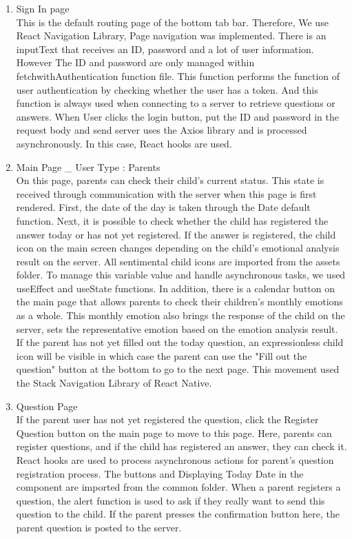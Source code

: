 \documentclass[conference]{IEEEtran}
\begin{document}
\begin{enumerate}
\begin{enumerate}
\begin{enumerate}
               \newline
               \item Sign In page
               \\This is the default routing page of the bottom tab bar. Therefore, We use React Navigation Library, Page navigation was implemented. There is an inputText that receives an ID, password and a lot of user information. However The ID and password are only managed within fetchwithAuthentication function file. This function performs the function of user authentication by checking whether the user has a token. And this function is always used when connecting to a server to retrieve questions or answers. When User clicks the login button, put the ID and password in the request body and send server uses the Axios library and is processed asynchronously. In this case, React hooks are used.
               \newline
               \item Main Page \_ User Type : Parents
               \\On this page, parents can check their child's current status. This state is received through communication with the server when this page is first rendered. First, the date of the day is taken through the Date default function. Next, it is possible to check whether the child has registered the answer today or has not yet registered. If the answer is registered, the child icon on the main screen changes depending on the child's emotional analysis result on the server. All sentimental child icons are imported from the assets folder. To manage this variable value and handle asynchronous tasks, we used useEffect and useState functions. In addition, there is a calendar button on the main page that allows parents to check their children's monthly emotions as a whole. This monthly emotion also brings the response of the child on the server, sets the representative emotion based on the emotion analysis result. If the parent has not yet filled out the today question, an expressionless child icon will be visible in which case the parent can use the "Fill out the question" button at the bottom to go to the next page. This movement used the Stack Navigation Library of React Native.
               \newline
               \item Question Page
               \\If the parent user has not yet registered the question, click the Register Question button on the main page to move to this page. Here, parents can register questions, and if the child has registered an answer, they can check it. React hooks are used to process asynchronous actions for parent's question registration process. The buttons and Displaying Today Date in the component are imported from the common folder. When a parent registers a question, the alert function is used to ask if they really want to send this question to the child. If the parent presses the confirmation button here, the parent question is posted to the server.

\end{enumerate}
\end{enumerate}
\end{enumerate}
\end{document}
